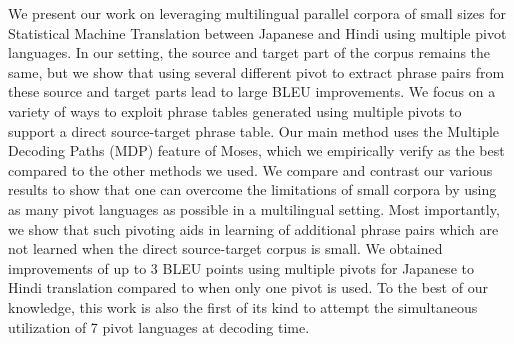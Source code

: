 We present our work on leveraging multilingual parallel corpora of small sizes for Statistical Machine Translation between Japanese and Hindi using multiple pivot languages. In our setting, the source and target part of the corpus remains the same, but we show that using several different pivot to extract phrase pairs from these source and target parts lead to large BLEU improvements. We focus on a variety of ways to exploit phrase tables generated using multiple pivots to support a direct source-target phrase table. Our main method uses the Multiple Decoding Paths (MDP) feature of Moses, which we empirically verify as the best compared to the other methods we used. We compare and contrast our various results to show that one can overcome the limitations of small corpora by using as many pivot languages as possible in a multilingual setting. Most importantly, we show that such pivoting aids in learning of additional phrase pairs which are not learned when the direct source-target corpus is small. We obtained improvements of up to 3 BLEU points using multiple pivots for Japanese to Hindi translation compared to when only one pivot is used. To the best of our knowledge, this work is also the first of its kind to attempt the simultaneous utilization of 7 pivot languages at decoding time.
